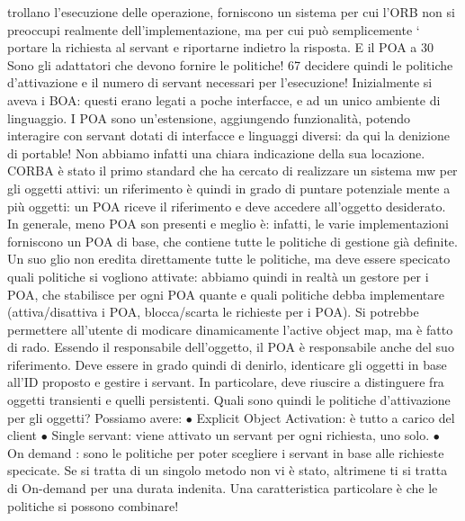trollano l'esecuzione delle operazione, forniscono un sistema per cui l'ORB non
si preoccupi realmente dell'implementazione, ma per cui può semplicemente
`
portare la richiesta al servant e riportarne indietro la risposta. E il POA a
30 Sono
gli adattatori che devono fornire le politiche!
67
decidere quindi le politiche d'attivazione e il numero di servant necessari per
l'esecuzione!
Inizialmente si aveva i BOA: questi erano legati a poche interfacce, e ad un
unico ambiente di linguaggio. I POA sono un'estensione, aggiungendo funzionalità, potendo interagire con servant dotati
di interfacce e linguaggi diversi: da
qui la denizione di portable! Non abbiamo infatti una chiara indicazione della
sua locazione.
CORBA è stato il primo standard che ha cercato di realizzare un sistema
mw per gli oggetti attivi: un riferimento è quindi in grado di puntare potenziale
mente a più oggetti: un POA riceve il riferimento e deve accedere all'oggetto
desiderato. In generale, meno POA son presenti e meglio è: infatti, le varie
implementazioni forniscono un POA di base, che contiene tutte le politiche di
gestione già definite. Un suo glio non eredita direttamente tutte le politiche, ma
deve essere specicato quali politiche si vogliono attivate: abbiamo quindi in realtà un gestore per i POA, che
stabilisce per ogni POA quante e quali politiche
debba implementare (attiva/disattiva i POA, blocca/scarta le richieste per i
POA). Si potrebbe permettere all'utente di modicare dinamicamente l'active
object map, ma è fatto di rado.
Essendo il responsabile dell'oggetto, il POA è responsabile anche del suo
riferimento. Deve essere in grado quindi di denirlo, identicare gli oggetti in
base all'ID proposto e gestire i servant. In particolare, deve riuscire a distinguere
fra oggetti transienti e quelli persistenti.
Quali sono quindi le politiche d'attivazione per gli oggetti? Possiamo avere:
$\bullet$ Explicit Object Activation: è tutto a carico del client
$\bullet$ Single servant: viene attivato un servant per ogni richiesta, uno solo.
$\bullet$ On demand : sono le politiche per poter scegliere i servant in base alle richieste specicate. Se si tratta di
un singolo metodo non vi è stato, altrimene
ti si tratta di On-demand per una durata indenita. Una caratteristica
particolare è che le politiche si possono combinare!
